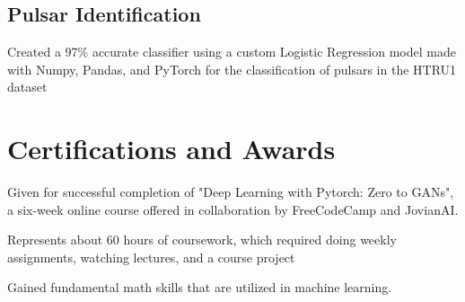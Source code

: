 \documentclass[]{resume-template}
\begin{document}
\begin{minipage}[t]{0.66\textwidth}
\subsection{Pulsar Identification}\label{subsec:pulsar-identification}
\vspace{\topsep} %
\begin{tightemize}
\item Created a 97\% accurate classifier using a custom Logistic Regression model made with Numpy, Pandas, and PyTorch for the classification of pulsars in the HTRU1 dataset
\end{tightemize}


\sectionsep{}




\section{Certifications and Awards}\label{sec:certifications-and-awards}

\begin{tightemize}
\item Given for successful completion of "Deep Learning with Pytorch: Zero to GANs",
             a six-week online course offered in collaboration by FreeCodeCamp and JovianAI.
\item Represents about 60 hours of coursework, which required doing weekly assignments, watching lectures, and a course project
\item Gained fundamental math skills that are utilized in machine learning. 
\end{tightemize}
\sectionsep{}


\end{minipage}
\end{document}
